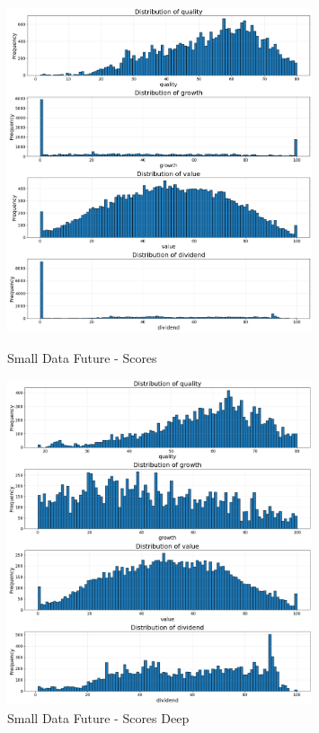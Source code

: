 \documentclass[11pt,english,a4paper,hidelinks]{book}
\begin{document}
\begin{figure}[H]
    \centering
    \begin{minipage}{0.48\textwidth}
        \centering
        \includegraphics[width=0.8\textwidth]{images/code/descriptive analysis/distributions/Small Data future - Scores.png}
    \caption{Small Data Future - Scores}
    \label{fig:small_future_scores}
    \end{minipage}\hfill
    \begin{minipage}{0.48\textwidth}
        \centering
        \includegraphics[width=0.8\textwidth]{images/code/descriptive analysis/distributions/Small Data future - Scores Deep.png}
        \caption{Small Data Future - Scores Deep}
        \label{fig:small_future_scores_deep}
    \end{minipage}
\end{figure}
\end{document}
